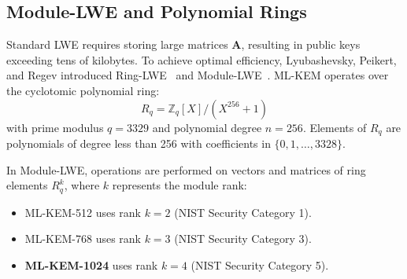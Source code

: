 \subsection{Module-LWE and Polynomial Rings}
Standard LWE requires storing large matrices $\mathbf{A}$, resulting in public keys exceeding tens of kilobytes. To achieve optimal efficiency, Lyubashevsky, Peikert, and Regev introduced Ring-LWE~\cite{lyubashevsky2012ideal} and Module-LWE~\cite{bos2018crystals}. ML-KEM operates over the cyclotomic polynomial ring:
\begin{equation}
R_q = \mathbb{Z}_q[X] / (X^{256} + 1)
\end{equation}
with prime modulus $q = 3329$ and polynomial degree $n = 256$. Elements of $R_q$ are polynomials of degree less than 256 with coefficients in $\{0, 1, \dots, 3328\}$.

In Module-LWE, operations are performed on vectors and matrices of ring elements $R_q^k$, where $k$ represents the module rank:
\begin{itemize}
    \item ML-KEM-512 uses rank $k = 2$ (NIST Security Category 1).
    \item ML-KEM-768 uses rank $k = 3$ (NIST Security Category 3).
    \item \textbf{ML-KEM-1024} uses rank $k = 4$ (NIST Security Category 5).
\end{itemize}

